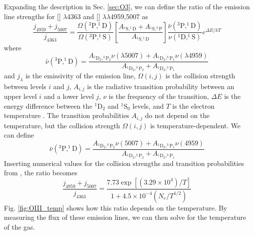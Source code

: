 Expanding the description in Sec. \ref{sec:O3}, we can define the ratio of the 
emission line strengths for [] $\lambda$4363 and [] 
$\lambda \lambda$4959,5007 as
\begin{equation}
    \frac{j_{4959} + j_{5007}}{j_{4363}} = \frac{\Omega(^3\text{P}, ^1\text{D})}{\Omega(^3\text{P}, ^1\text{S})} \left[ \frac{A_{^1\text{S}, ^1\text{D}} + A_{^1\text{S}, ^3\text{P}}}{A_{^1\text{S}, ^1\text{D}}} \right] \frac{\bar{\nu}(^3\text{P}, ^1\text{D})}{\nu(^1\text{D}, ^1\text{S})} e^{\Delta E/kT}
\end{equation}
where
\begin{equation}
    \bar{\nu}(^3\text{P}, ^1\text{D}) = \frac{A_{^1\text{D}_2, ^3\text{P}_2}\nu (\lambda 5007) + A_{^1\text{D}_2, ^3\text{P}_1}\nu (\lambda 4959)}{A_{^1\text{D}_2, ^3\text{P}_2} + A_{^1\text{D}_2, ^3\text{P}_1}}
\end{equation}
and $j_\lambda$ is the emissivity of the emission line, $\Omega (i,j)$ is the 
collision strength between levels $i$ and $j$, $A_{i,j}$ is the radiative 
transition probability between an upper level $i$ and a lower level $j$, $\nu$ 
is the frequency of the transition, $\Delta E$ is the energy difference between 
the $^1$D$_2$ and $^1$S$_0$ levels, and $T$ is the electron temperature 
\citep{Osterbrock89}.  The transition probabilities $A_{i,j}$ do not depend on 
the temperature, but the collision strength $\Omega (i,j)$ is 
temperature-dependent.  We can define
\begin{equation}
    \bar{\nu}(^3\text{P}, ^1\text{D}) = \frac{A_{^1\text{D}_2, ^3\text{P}_2} \nu (5007) + A_{^1\text{D}_2, ^3\text{P}_1} \nu (4959)}{A_{^1\text{D}_2, ^3\text{P}_2} + A_{^1\text{D}_2, ^3\text{P}_1}}
\end{equation}
Inserting numerical values for the collision strengths and transition 
probabilities from \cite{Osterbrock89}, the ratio becomes
\begin{equation}
    \frac{j_{4959} + j_{5007}}{j_{4363}} = \frac{7.73 \exp[(3.29\times 10^4)/T]}{1 + 4.5\times 10^{-4} (N_e/T^{1/2})}
\end{equation}
Fig. \ref{fig:OIII_temp} shows how this ratio depends on the temperature.  By 
measuring the flux of these emission lines, we can then solve for the 
temperature of the gas.

